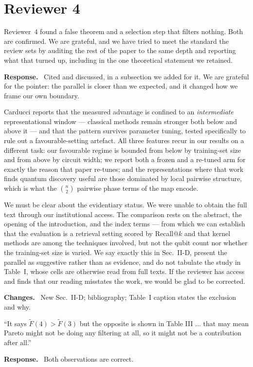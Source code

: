 \documentclass[11pt,a4paper]{article}
\newenvironment{revcomment}
  {\par\addvspace{6pt}\begingroup
   \color{quotegray}\itshape\small
   \begin{list}{}{%
     \setlength{\leftmargin}{1.8em}\setlength{\rightmargin}{1.0em}%
     \setlength{\topsep}{0pt}\setlength{\partopsep}{0pt}%
     \setlength{\parsep}{3pt}\setlength{\itemsep}{0pt}}%
   \item[]}
  {\end{list}\endgroup\normalcolor\addvspace{6pt}}
\newcommand{\itemhead}[2]{%
  \par\addvspace{15pt}%
  \noindent{\bfseries\color{tagink}#1}\hspace{0.7em}{\bfseries #2}%
  \par\addvspace{3.5pt}%
  \noindent{\color{rulegray}\rule{\linewidth}{0.5pt}}%
  \par\addvspace{5pt}%
  \nobreak}
\newcommand{\resp}{\par\addvspace{2pt}\noindent\textbf{Response.}\ }
\newcommand{\changed}{\par\addvspace{5pt}\noindent
  {\bfseries\color{tagink}Changes.}\ }
\begin{document}
\section{Reviewer 4}

Reviewer~4 found a false theorem and a selection step that filters nothing. Both
are confirmed. We are grateful, and we have tried to meet the standard the
review sets by auditing the rest of the paper to the same depth and reporting
what that turned up, including in the one theoretical statement we retained.

\itemhead{R4-1}{Related work: Carducci, ICAD 2026, on the same question for
malware detection}
\resp
Cited and discussed, in a subsection we added for it. We are grateful for the
pointer: the parallel is closer than we expected, and it changed how we frame
our own boundary.

Carducci reports that the measured advantage is confined to an
\emph{intermediate} representational window --- classical methods remain
stronger both below and above it --- and that the pattern survives parameter
tuning, tested specifically to rule out a favourable-setting artefact. All three
features recur in our results on a different task: our favourable regime is
bounded from below by training-set size and from above by circuit width; we
report both a frozen and a re-tuned arm for exactly the reason that paper
re-tunes; and the representations where that work finds quantum discovery useful
are those dominated by local pairwise structure, which is what the
$\binom{n}{2}$ pairwise phase terms of the \ZZ{} map encode.

We must be clear about the evidentiary status. We were unable to obtain the full
text through our institutional access. The comparison rests on the abstract, the
opening of the introduction, and the index terms --- from which we can establish
that the evaluation is a retrieval setting scored by Recall@$k$ and that kernel
methods are among the techniques involved, but not the qubit count nor whether
the training-set size is varied. We say exactly this in Sec.~II-D, present the
parallel as suggestive rather than as evidence, and do not tabulate the study in
Table~I, whose cells are otherwise read from full texts. If the reviewer has
access and finds that our reading misstates the work, we would be glad to be
corrected.
\changed
New Sec.~II-D; bibliography; Table~I caption states the exclusion and why.

\itemhead{R4-2}{Theorem~1 appears misstated; and the Pareto step may not filter
anything}
\begin{revcomment}
``It says $\tilde F(4) > \tilde F(3)$ but the opposite is shown in Table III
$\ldots$ that may mean Pareto might not be doing any filtering at all, so it
might not be a contribution after all.''
\end{revcomment}
\resp
Both observations are correct.
\end{document}
